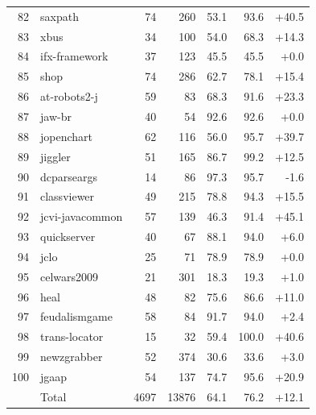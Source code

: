 \begin{table}[p]
\begin{tabular}[t]{rlrrrrr}
82 & saxpath & 74 & 260 & 53.1 & 93.6 & +40.5 \\
83 & xbus & 34 & 100 & 54.0 & 68.3 & +14.3 \\
84 & ifx-framework & 37 & 123 & 45.5 & 45.5 & +0.0 \\
85 & shop & 74 & 286 & 62.7 & 78.1 & +15.4 \\
86 & at-robots2-j & 59 & 83 & 68.3 & 91.6 & +23.3 \\
87 & jaw-br & 40 & 54 & 92.6 & 92.6 & +0.0 \\
88 & jopenchart & 62 & 116 & 56.0 & 95.7 & +39.7 \\
89 & jiggler & 51 & 165 & 86.7 & 99.2 & +12.5 \\
90 & dcparseargs & 14 & 86 & 97.3 & 95.7 & -1.6 \\
91 & classviewer & 49 & 215 & 78.8 & 94.3 & +15.5 \\
92 & jcvi-javacommon & 57 & 139 & 46.3 & 91.4 & +45.1 \\
93 & quickserver & 40 & 67 & 88.1 & 94.0 & +6.0 \\
94 & jclo & 25 & 71 & 78.9 & 78.9 & +0.0 \\
95 & celwars2009 & 21 & 301 & 18.3 & 19.3 & +1.0 \\
96 & heal & 48 & 82 & 75.6 & 86.6 & +11.0 \\
97 & feudalismgame & 58 & 84 & 91.7 & 94.0 & +2.4 \\
98 & trans-locator & 15 & 32 & 59.4 & 100.0 & +40.6 \\
99 & newzgrabber & 52 & 374 & 30.6 & 33.6 & +3.0 \\
100 & jgaap & 54 & 137 & 74.7 & 95.6 & +20.9 \\
\midrule
 & Total & 4697 & 13876 & 64.1 & 76.2 & +12.1 \\
\bottomrule
\end{tabular}
\end{table}
